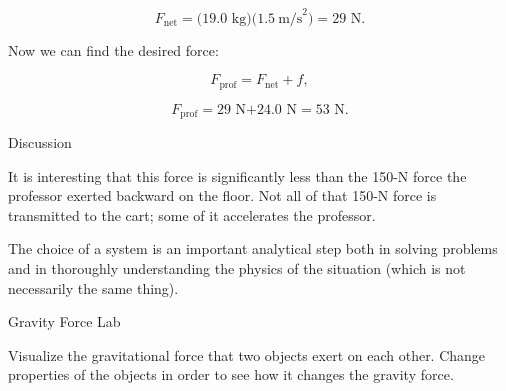 \documentclass[
]{book}
\newenvironment{tinysection}{}{}
\newenvironment{note}{}{}
\begin{document}
\leavevmode\hypertarget{eip-id1454423}{}%
\[{{F_{\text{net}} = (}\text{19}\text{.}\text{0\ kg})(1.5\ \text{m/s}^{2}{) = \text{29\ N}}}.\]

Now we can find the desired force:

\leavevmode\hypertarget{eip-id1004496}{}%
\[{F_{\text{prof}} = {F_{\text{net}} + f}},\]

\leavevmode\hypertarget{eip-id1197329}{}%
\[{{F_{\text{prof}} = \text{29\ N}}{+ \text{24.0\ N} = \text{53\ N}}}.\]

\begin{tinysection}

{Discussion}

\end{tinysection}

It is interesting that this force is significantly less than the 150-N
force the professor exerted backward on the floor. Not all of that 150-N
force is transmitted to the cart; some of it accelerates the professor.

The choice of a system is an important analytical step both in solving
problems and in thoroughly understanding the physics of the situation
(which is not necessarily the same thing).

\hypertarget{eip-984}{}
\begin{note}

Gravity Force Lab

Visualize the gravitational force that two objects exert on each other.
Change properties of the objects in order to see how it changes the
gravity force.

\hypertarget{GravityForceLab}{}

\end{note}
\end{document}
